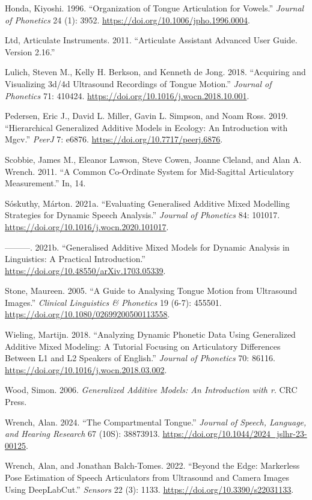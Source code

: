 \documentclass[
]{interact}
\newlength{\cslhangindent}
\newenvironment{CSLReferences}[2] %
 {\begin{list}{}{%
  \setlength{\itemindent}{0pt}
  \setlength{\leftmargin}{0pt}
  \setlength{\parsep}{0pt}
  \ifodd #1
   \setlength{\leftmargin}{\cslhangindent}
   \setlength{\itemindent}{-1\cslhangindent}
  \fi
  \setlength{\itemsep}{#2\baselineskip}}}
 {\end{list}}
\begin{document}
\begin{CSLReferences}{1}{0}
Honda, Kiyoshi. 1996. {``Organization of Tongue Articulation for
Vowels.''} \emph{Journal of Phonetics} 24 (1): 3952.
\url{https://doi.org/10.1006/jpho.1996.0004}.

Ltd, Articulate Instruments. 2011. {``Articulate Assistant Advanced User
Guide. {Version} 2.16.''}

Lulich, Steven M., Kelly H. Berkson, and Kenneth de Jong. 2018.
{``Acquiring and Visualizing 3d/4d Ultrasound Recordings of Tongue
Motion.''} \emph{Journal of Phonetics} 71: 410424.
\url{https://doi.org/10.1016/j.wocn.2018.10.001}.

Pedersen, Eric J., David L. Miller, Gavin L. Simpson, and Noam Ross.
2019. {``Hierarchical Generalized Additive Models in Ecology: An
Introduction with Mgcv.''} \emph{PeerJ} 7: e6876.
\url{https://doi.org/10.7717/peerj.6876}.

Scobbie, James M., Eleanor Lawson, Steve Cowen, Joanne Cleland, and Alan
A. Wrench. 2011. {``A Common Co-Ordinate System for Mid-Sagittal
Articulatory Measurement.''} In, 14.

Sóskuthy, Márton. 2021a. {``Evaluating Generalised Additive Mixed
Modelling Strategies for Dynamic Speech Analysis.''} \emph{Journal of
Phonetics} 84: 101017. \url{https://doi.org/10.1016/j.wocn.2020.101017}.

---------. 2021b. {``Generalised Additive Mixed Models for Dynamic
Analysis in Linguistics: A Practical Introduction.''}
\url{https://doi.org/10.48550/arXiv.1703.05339}.

Stone, Maureen. 2005. {``A Guide to Analysing Tongue Motion from
Ultrasound Images.''} \emph{Clinical Linguistics \& Phonetics} 19 (6-7):
455501. \url{https://doi.org/10.1080/02699200500113558}.

Wieling, Martijn. 2018. {``Analyzing Dynamic Phonetic Data Using
Generalized Additive Mixed Modeling: A Tutorial Focusing on Articulatory
Differences Between L1 and L2 Speakers of English.''} \emph{Journal of
Phonetics} 70: 86116. \url{https://doi.org/10.1016/j.wocn.2018.03.002}.

Wood, Simon. 2006. \emph{Generalized Additive Models: An Introduction
with r}. CRC Press.

Wrench, Alan. 2024. {``The Compartmental Tongue.''} \emph{Journal of
Speech, Language, and Hearing Research} 67 (10S): 38873913.
\url{https://doi.org/10.1044/2024_jslhr-23-00125}.

Wrench, Alan, and Jonathan Balch-Tomes. 2022. {``Beyond the Edge:
Markerless Pose Estimation of Speech Articulators from Ultrasound and
Camera Images Using DeepLabCut.''} \emph{Sensors} 22 (3): 1133.
\url{https://doi.org/10.3390/s22031133}.

\end{CSLReferences}
\end{document}
